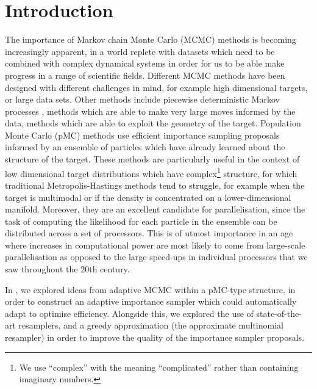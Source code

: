 \documentclass[final]{siamltex}
\begin{document}
\section{Introduction}
The importance of Markov chain Monte Carlo (MCMC) methods is becoming
increasingly apparent, in a world replete with datasets which need to be
combined with complex dynamical systems in order for us to be able
make progress in a range of scientific fields. Different MCMC methods
have been designed with different challenges in mind, for example high dimensional
targets\cite{cotter2013mcmc}, or large data
sets\cite{bierkens2016zig}. 
Other methods include piecewise deterministic Markov processes
\cite{bouchard2018bouncy},
methods which are able to make very large moves informed by the
data\cite{teh2016consistency,duane1987hybrid}, methods which are able to exploit
the geometry of the target\cite{girolami2011riemann}. Population Monte Carlo
(pMC) methods use efficient importance sampling proposals informed by an
ensemble of particles which have already learned about the structure
of the target\cite{cappe2012population,cappe2008adaptive,douc2007convergence,douc2007minimum, martino2017layered, cornuet2012adaptive, martino2015adaptive}. These methods are particularly useful in the context of
low dimensional target distributions which have complex\footnote{We
  use ``complex'' with the meaning ``complicated'' rather than
  containing imaginary numbers.} structure, for
which traditional Metropolis-Hastings methods tend to struggle, for
example when the target is multimodal or if the density is
concentrated on a lower-dimensional manifold. Moreover, they are an
excellent candidate for parallelisation, since the task of computing
the likelihood for each particle in the ensemble can be distributed
across a set of processors. This is of utmost importance in an age
where increases in computational power are most likely to come from
large-scale parallelisation as opposed to the large speed-ups in
individual processors that we saw throughout the 20th century.

In \cite{cotter2015parallel}, we explored ideas from adaptive MCMC within a
pMC-type structure, in order to construct an adaptive importance
sampler which could automatically adapt to optimise
efficiency. Alongside this, we explored the use of state-of-the-art
resamplers\cite{reich2013nonparametric}, and a greedy approximation (the
approximate multinomial resampler) in order to improve the quality of
the importance sampler proposals.
\end{document}
